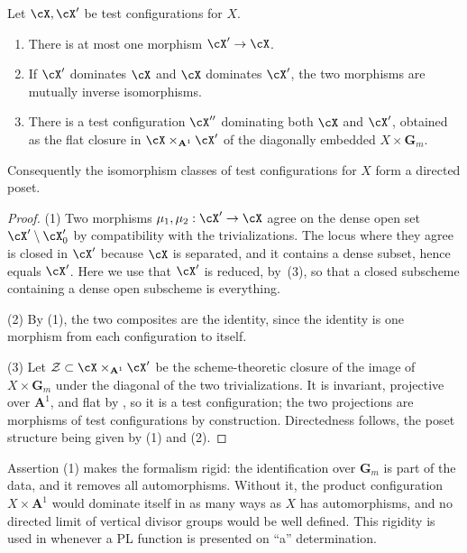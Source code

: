 \begin{proposition}\label{prop:ch33-directed-poset}
Let $\cX,\cX'$ be test configurations for $X$.
\begin{enumerate}
\item There is at most one morphism $\cX'\to\cX$.
\item If $\cX'$ dominates $\cX$ and $\cX$ dominates $\cX'$, the two
 morphisms are mutually inverse isomorphisms.
\item There is a test configuration $\cX''$ dominating both $\cX$ and
 $\cX'$, obtained as the flat closure in $\cX\times_{\mathbf A^1}\cX'$
 of the diagonally embedded $X\times\mathbf G_m$.
\end{enumerate}
Consequently the isomorphism classes of test configurations for $X$ form
a directed poset.
\end{proposition}

\begin{proof}
(1)  Two morphisms $\mu_1,\mu_2:\cX'\to\cX$ agree on the dense open set
$\cX'\setminus\cX'_0$ by compatibility with the trivializations.  The
locus where they agree is closed in $\cX'$ because $\cX$ is separated,
and it contains a dense subset, hence equals $\cX'$.  Here we use that
$\cX'$ is reduced, by \,(3), so
that a closed subscheme containing a dense open subscheme is everything.

(2)  By (1), the two composites are the identity, since the identity is one
morphism from each configuration to itself.

(3)  Let $\mathcal Z\subset\cX\times_{\mathbf A^1}\cX'$ be the scheme-theoretic
closure of the image of $X\times\mathbf G_m$ under the diagonal of the two
trivializations.  It is invariant, projective over $\mathbf A^1$, and flat
by , so it is a test configuration; the
two projections are morphisms of test configurations by construction.
Directedness follows, the poset structure being given by (1) and (2).
\end{proof}

\begin{remark}
\label{rem:ch33-domination-rigid}
Assertion (1) makes the formalism rigid: the identification
over $\mathbf G_m$ is part of the data, and it removes all automorphisms.
Without it, the product configuration $X\times\mathbf A^1$ would dominate
itself in as many ways as $X$ has automorphisms, and no directed limit of
vertical divisor groups would be well defined.  This rigidity is used in
 whenever a PL function is presented on
``a'' determination.
\end{remark}

